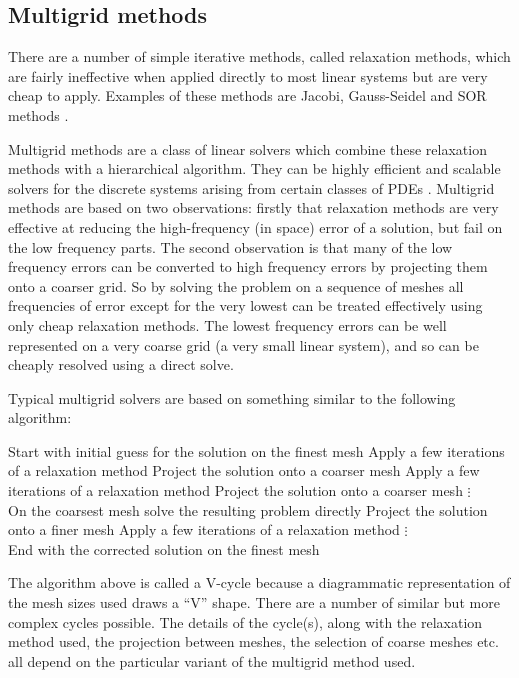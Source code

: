 \subsection{Multigrid methods}
\label{sec:multigrid-methods}

There are a number of simple iterative methods, called relaxation methods, which are fairly ineffective when applied directly to most linear systems but are very cheap to apply.
Examples of these methods are Jacobi, Gauss-Seidel and SOR methods \cite[103]{Saad2000}.

Multigrid methods are a class of linear solvers which combine these relaxation methods with a hierarchical algorithm.
They can be highly efficient and scalable solvers for the discrete systems arising from certain classes of PDEs \cite{multigrid-tut}.
Multigrid methods are based on two observations: firstly that relaxation methods are very effective at reducing the high-frequency (in space) error of a solution, but fail on the low frequency parts.
The second observation is that many of the low frequency errors can be converted to high frequency errors by projecting them onto a coarser grid.
So by solving the problem on a sequence of meshes all frequencies of error except for the very lowest can be treated effectively using only cheap relaxation methods.
The lowest frequency errors can be well represented on a very coarse grid (\ie a very small linear system), and so can be cheaply resolved using a direct solve.

Typical multigrid solvers are based on something similar to the following algorithm:

\begin{algorithm}[H]
Start with initial guess for the solution on the finest mesh\;
Apply a few iterations of a relaxation method\;
Project the solution onto a coarser mesh\;
Apply a few iterations of a relaxation method\;
Project the solution onto a coarser mesh\;
\qquad $\vdots$\\
On the coarsest mesh solve the resulting problem directly\;
Project the solution onto a finer mesh\;
Apply a few iterations of a relaxation method\;
\qquad $\vdots$\\
End with the corrected solution on the finest mesh\;
\end{algorithm}

The algorithm above is called a V-cycle because a diagrammatic representation of the mesh sizes used draws a ``V'' shape.
There are a number of similar but more complex cycles possible.
The details of the cycle(s), along with the relaxation method used, the projection between meshes, the selection of coarse meshes etc. all depend on the particular variant of the multigrid method used.

